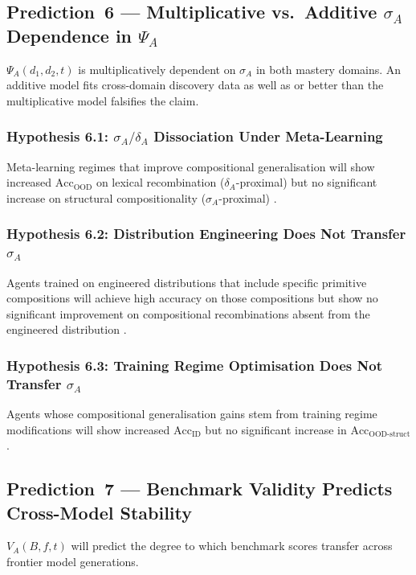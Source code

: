 \documentclass[11pt]{article}
\theoremstyle{definition}
\theoremstyle{plain}
\begin{document}
\subsection{Prediction~6 --- Multiplicative vs.\ Additive \texorpdfstring{$\sigma_A$}{sigma\_A}
Dependence in \texorpdfstring{$\Psi_A$}{Psi\_A}}
$\Psi_A(d_1,d_2,t)$ is multiplicatively dependent on $\sigma_A$ in both
mastery domains. An additive model fits cross-domain discovery data as
well as or better than the multiplicative model falsifies the claim.

\subsubsection*{Hypothesis 6.1: \texorpdfstring{$\sigma_A/\delta_A$}{sigma\_A/delta\_A} Dissociation Under Meta-Learning}
Meta-learning regimes that improve compositional generalisation will
show increased $\text{Acc}_{\text{OOD}}$ on lexical recombination
($\delta_A$-proximal) but no significant increase on structural
compositionality ($\sigma_A$-proximal)
\citep{lake2023humanlikesystematicgeneralization}.

\subsubsection*{Hypothesis 6.2: Distribution Engineering Does Not Transfer \texorpdfstring{$\sigma_A$}{sigma\_A}}
Agents trained on engineered distributions that include specific
primitive compositions will achieve high accuracy on those compositions
but show no significant improvement on compositional recombinations
absent from the engineered distribution
\citep{patel2022revisitingcompositionalgeneralization}.

\subsubsection*{Hypothesis 6.3: Training Regime Optimisation Does Not Transfer \texorpdfstring{$\sigma_A$}{sigma\_A}}
Agents whose compositional generalisation gains stem from training regime
modifications will show increased $\text{Acc}_{\text{ID}}$ but no
significant increase in $\text{Acc}_{\text{OOD-struct}}$.

\subsection{Prediction~7 --- Benchmark Validity Predicts Cross-Model
Stability}
$V_A(B,f,t)$ will predict the degree to which benchmark scores transfer
across frontier model generations.
\end{document}
